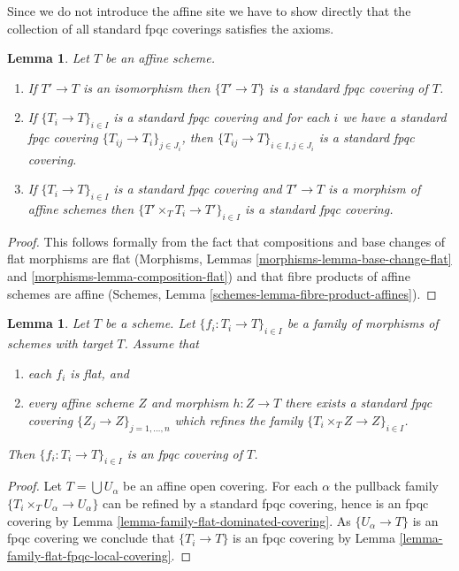 \documentclass{stacks-project}
\theoremstyle{plain}
\newtheorem{lemma}[subsection]{Lemma}
\theoremstyle{definition}
\theoremstyle{remark}
\numberwithin{equation}{subsection}
\begin{document}
\noindent
Since we do not introduce the affine site we have to show directly
that the collection of all standard fpqc coverings satisfies the
axioms.

\begin{lemma}
\label{lemma-fpqc-affine-axioms}
Let $T$ be an affine scheme.
\begin{enumerate}
\item If $T' \to T$ is an isomorphism then $\{T' \to T\}$
is a standard fpqc covering of $T$.
\item If $\{T_i \to T\}_{i\in I}$ is a standard fpqc covering and for each
$i$ we have a standard fpqc covering $\{T_{ij} \to T_i\}_{j\in J_i}$, then
$\{T_{ij} \to T\}_{i \in I, j\in J_i}$ is a standard fpqc covering.
\item If $\{T_i \to T\}_{i\in I}$ is a standard fpqc covering
and $T' \to T$ is a morphism of affine schemes then
$\{T' \times_T T_i \to T'\}_{i\in I}$ is a standard fpqc covering.
\end{enumerate}
\end{lemma}

\begin{proof}
This follows formally from the fact that compositions and base changes
of flat morphisms are flat
(Morphisms, Lemmas \ref{morphisms-lemma-base-change-flat} and
\ref{morphisms-lemma-composition-flat})
and that fibre products of affine schemes are affine
(Schemes, Lemma \ref{schemes-lemma-fibre-product-affines}).
\end{proof}

\begin{lemma}
\label{lemma-fpqc-covering-affines-mapping-in}
Let $T$ be a scheme. Let $\{f_i : T_i \to T\}_{i \in I}$ be a family of
morphisms of schemes with target $T$. Assume that
\begin{enumerate}
\item each $f_i$ is flat, and
\item every affine scheme
$Z$ and morphism $h : Z \to T$ there exists a standard fpqc covering
$\{Z_j \to Z\}_{j = 1, \ldots, n}$ which refines the family
$\{T_i \times_T Z \to Z\}_{i \in I}$.
\end{enumerate}
Then $\{f_i : T_i \to T\}_{i \in I}$ is an fpqc covering of $T$.
\end{lemma}

\begin{proof}
Let $T = \bigcup U_\alpha$ be an affine open covering.
For each $\alpha$ the pullback family $\{T_i \times_T U_\alpha \to U_\alpha\}$
can be refined by a standard fpqc covering, hence is an
fpqc covering by Lemma
\ref{lemma-family-flat-dominated-covering}.
As $\{U_\alpha \to T\}$ is an fpqc covering we conclude that
$\{T_i \to T\}$ is an fpqc covering by
Lemma \ref{lemma-family-flat-fpqc-local-covering}.
\end{proof}
\end{document}
